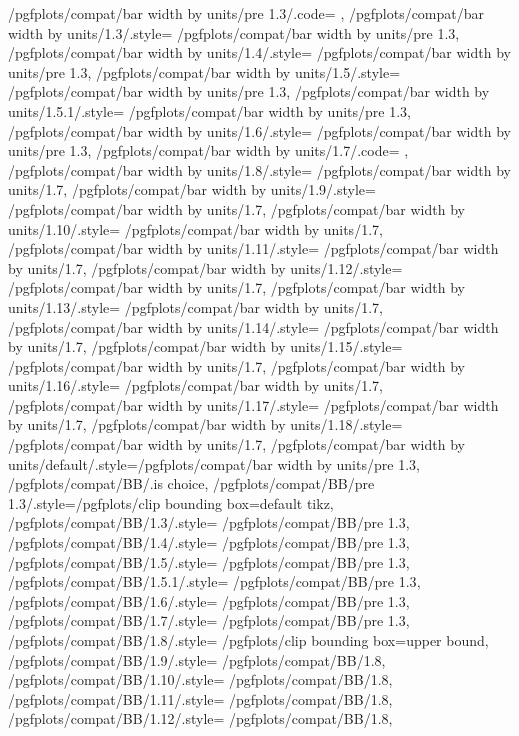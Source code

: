 {	/pgfplots/compat/bar width by units/pre 1.3/.code=	{\def\b@pgfplots@compat@bar@width@units{1}},%
	/pgfplots/compat/bar width by units/1.3/.style=	{/pgfplots/compat/bar width by units/pre 1.3},
	/pgfplots/compat/bar width by units/1.4/.style=	{/pgfplots/compat/bar width by units/pre 1.3},%
	/pgfplots/compat/bar width by units/1.5/.style=	{/pgfplots/compat/bar width by units/pre 1.3},%
	/pgfplots/compat/bar width by units/1.5.1/.style=	{/pgfplots/compat/bar width by units/pre 1.3},%
	/pgfplots/compat/bar width by units/1.6/.style=	{/pgfplots/compat/bar width by units/pre 1.3},%
	/pgfplots/compat/bar width by units/1.7/.code=		{\def\b@pgfplots@compat@bar@width@units{0}},%
	/pgfplots/compat/bar width by units/1.8/.style=		{/pgfplots/compat/bar width by units/1.7},
	/pgfplots/compat/bar width by units/1.9/.style=		{/pgfplots/compat/bar width by units/1.7},
	/pgfplots/compat/bar width by units/1.10/.style=		{/pgfplots/compat/bar width by units/1.7},
	/pgfplots/compat/bar width by units/1.11/.style=		{/pgfplots/compat/bar width by units/1.7},
	/pgfplots/compat/bar width by units/1.12/.style=		{/pgfplots/compat/bar width by units/1.7},
	/pgfplots/compat/bar width by units/1.13/.style=		{/pgfplots/compat/bar width by units/1.7},
	/pgfplots/compat/bar width by units/1.14/.style=		{/pgfplots/compat/bar width by units/1.7},
	/pgfplots/compat/bar width by units/1.15/.style=		{/pgfplots/compat/bar width by units/1.7},
	/pgfplots/compat/bar width by units/1.16/.style=		{/pgfplots/compat/bar width by units/1.7},
	/pgfplots/compat/bar width by units/1.17/.style=		{/pgfplots/compat/bar width by units/1.7},
	/pgfplots/compat/bar width by units/1.18/.style=		{/pgfplots/compat/bar width by units/1.7},
	/pgfplots/compat/bar width by units/default/.style={/pgfplots/compat/bar width by units/pre 1.3},
	/pgfplots/compat/BB/.is choice,
	/pgfplots/compat/BB/pre 1.3/.style={/pgfplots/clip bounding box=default tikz},%
	/pgfplots/compat/BB/1.3/.style=	{/pgfplots/compat/BB/pre 1.3},
	/pgfplots/compat/BB/1.4/.style=	{/pgfplots/compat/BB/pre 1.3},%
	/pgfplots/compat/BB/1.5/.style=	{/pgfplots/compat/BB/pre 1.3},%
	/pgfplots/compat/BB/1.5.1/.style=	{/pgfplots/compat/BB/pre 1.3},%
	/pgfplots/compat/BB/1.6/.style=	{/pgfplots/compat/BB/pre 1.3},%
	/pgfplots/compat/BB/1.7/.style=	{/pgfplots/compat/BB/pre 1.3},%
	/pgfplots/compat/BB/1.8/.style=	{/pgfplots/clip bounding box=upper bound},%
	/pgfplots/compat/BB/1.9/.style=	{/pgfplots/compat/BB/1.8},%
	/pgfplots/compat/BB/1.10/.style=	{/pgfplots/compat/BB/1.8},%
	/pgfplots/compat/BB/1.11/.style=	{/pgfplots/compat/BB/1.8},%
	/pgfplots/compat/BB/1.12/.style=	{/pgfplots/compat/BB/1.8},%
}
